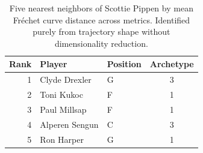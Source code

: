 \begin{table}[htbp]
  \centering\small
  \begin{tabular}{rllc}
    \toprule
    Rank & Player & Position & Archetype \\
    \midrule
    1 & Clyde Drexler & G & 3 \\
    2 & Toni Kukoc & F & 1 \\
    3 & Paul Millsap & F & 1 \\
    4 & Alperen Sengun & C & 3 \\
    5 & Ron Harper & G & 1 \\
    \bottomrule
  \end{tabular}
  \caption{Five nearest neighbors of Scottie Pippen by mean Fr\'{e}chet curve distance across metrics. Identified purely from trajectory shape without dimensionality reduction.}
  \label{tab:Scottie_Pippen_frechet_curve_neighbors}
\end{table}

